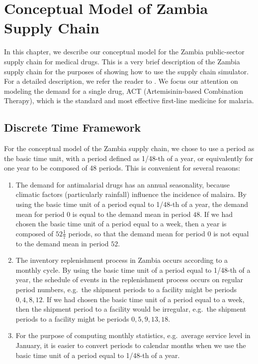\chapter[Conceptual Model (Zambia)]{Conceptual Model of Zambia Supply Chain}

In this chapter, we describe our conceptual model
for the Zambia public-sector supply chain for medical drugs.
This is a very brief description of the Zambia supply chain
for the purposes of showing how to use the supply chain simulator.
For a detailed description,
we refer the reader to \citet{gallien-leung-yadav-2014}.
We focus our attention on modeling the demand for a single drug,
ACT (Artemisinin-based Combination Therapy),
which is the standard and most effective first-line medicine for malaria.





\section{Discrete Time Framework}
\label{section:zambia->computer-model->time-unit}

For the conceptual model of the Zambia supply chain,
we chose to use a period as the basic time unit,
with a period defined as 1/48-th of a year,
or equivalently for one year to be composed of 48 periods.
This is convenient for several reasons:
\begin{enumerate}
\item
The demand for antimalarial drugs has an annual seasonality,
because climatic factors (particularly rainfall)
influence the incidence of malaira.
By using the basic time unit of a period equal to 1/48-th of a year,
the demand mean for period $0$ is equal to the demand mean in period $48$.
If we had chosen the basic time unit of a period equal to a week,
then a year is composed of $52\frac{1}{7}$ periods,
so that the demand mean for period $0$
is not equal to the demand mean in period $52$.
\item
The inventory replenishment process in Zambia
occurs according to a monthly cycle.
By using the basic time unit of a period equal to 1/48-th of a year,
the schedule of events in the replenishment process
occurs on regular period numbers,
e.g.\ the shipment periods to a facility might be periods $0, 4, 8, 12$.
If we had chosen the basic time unit of a period equal to a week,
then the shipment period to a facility would be irregular,
e.g.\ the shipment periods to a facility might be periods $0, 5, 9, 13, 18$.
\item
For the purpose of computing monthly statistics,
e.g.\ average service level in January,
it is easier to convert periods to calendar months
when we use the basic time unit of a period equal to 1/48-th of a year.
\end{enumerate}






